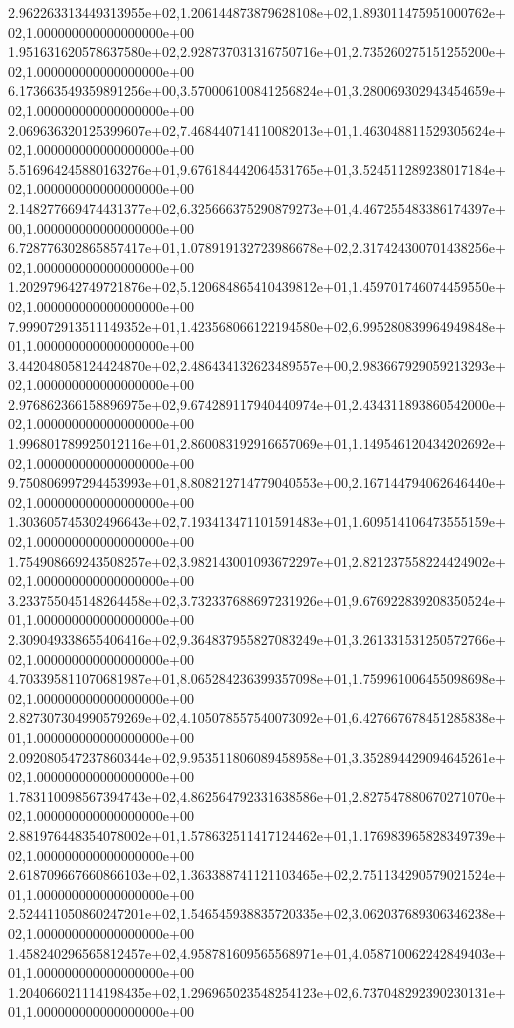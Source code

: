2.962263313449313955e+02,1.206144873879628108e+02,1.893011475951000762e+02,1.000000000000000000e+00
1.951631620578637580e+02,2.928737031316750716e+01,2.735260275151255200e+02,1.000000000000000000e+00
6.173663549359891256e+00,3.570006100841256824e+01,3.280069302943454659e+02,1.000000000000000000e+00
2.069636320125399607e+02,7.468440714110082013e+01,1.463048811529305624e+02,1.000000000000000000e+00
5.516964245880163276e+01,9.676184442064531765e+01,3.524511289238017184e+02,1.000000000000000000e+00
2.148277669474431377e+02,6.325666375290879273e+01,4.467255483386174397e+00,1.000000000000000000e+00
6.728776302865857417e+01,1.078919132723986678e+02,2.317424300701438256e+02,1.000000000000000000e+00
1.202979642749721876e+02,5.120684865410439812e+01,1.459701746074459550e+02,1.000000000000000000e+00
7.999072913511149352e+01,1.423568066122194580e+02,6.995280839964949848e+01,1.000000000000000000e+00
3.442048058124424870e+02,2.486434132623489557e+00,2.983667929059213293e+02,1.000000000000000000e+00
2.976862366158896975e+02,9.674289117940440974e+01,2.434311893860542000e+02,1.000000000000000000e+00
1.996801789925012116e+01,2.860083192916657069e+01,1.149546120434202692e+02,1.000000000000000000e+00
9.750806997294453993e+01,8.808212714779040553e+00,2.167144794062646440e+02,1.000000000000000000e+00
1.303605745302496643e+02,7.193413471101591483e+01,1.609514106473555159e+02,1.000000000000000000e+00
1.754908669243508257e+02,3.982143001093672297e+01,2.821237558224424902e+02,1.000000000000000000e+00
3.233755045148264458e+02,3.732337688697231926e+01,9.676922839208350524e+01,1.000000000000000000e+00
2.309049338655406416e+02,9.364837955827083249e+01,3.261331531250572766e+02,1.000000000000000000e+00
4.703395811070681987e+01,8.065284236399357098e+01,1.759961006455098698e+02,1.000000000000000000e+00
2.827307304990579269e+02,4.105078557540073092e+01,6.427667678451285838e+01,1.000000000000000000e+00
2.092080547237860344e+02,9.953511806089458958e+01,3.352894429094645261e+02,1.000000000000000000e+00
1.783110098567394743e+02,4.862564792331638586e+01,2.827547880670271070e+02,1.000000000000000000e+00
2.881976448354078002e+01,1.578632511417124462e+01,1.176983965828349739e+02,1.000000000000000000e+00
2.618709667660866103e+02,1.363388741121103465e+02,2.751134290579021524e+01,1.000000000000000000e+00
2.524411050860247201e+02,1.546545938835720335e+02,3.062037689306346238e+02,1.000000000000000000e+00
1.458240296565812457e+02,4.958781609565568971e+01,4.058710062242849403e+01,1.000000000000000000e+00
1.204066021114198435e+02,1.296965023548254123e+02,6.737048292390230131e+01,1.000000000000000000e+00
